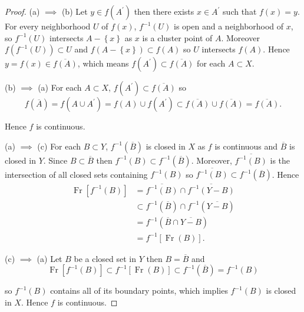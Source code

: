 \begin{proof}
	(a) \( \implies \) (b) Let \( y \in f(A^{\prime}) \) then there exists \( x \in A^{\prime} \) such that \( f(x) = y \). For every neighborhood \( U \) of \( f(x) \), \( f^{-1}(U) \) is open and a neighborhood of \( x \), so \( f^{-1}(U) \) intersects \( A - \left\{ x \right\} \) as \( x \) is a cluster point of \( A \). Moreover \( f(f^{-1}(U)) \subset U \) and \( f(A - \left\{x\right\}) \subset f(A) \) so \( U \) intersects \( f(A) \). Hence \( y = f(x) \in \overline{f(A)} \), which means \( f(A^{\prime}) \subset \overline{f(A)} \) for each \( A \subset X \).

	(b) \( \implies \) (a) For each \( A \subset X \), \( f(A^{\prime}) \subset \overline{f(A)} \) so
	\[
		f(\overline{A}) = f(A \cup A^{\prime}) = f(A) \cup f(A^{\prime}) \subset \overline{f(A)} \cup \overline{f(A)} = \overline{f(A)}.
	\]

	Hence \( f \) is continuous.

	(a) \( \implies \) (c) For each \( B \subset Y \), \( f^{-1}(\overline{B}) \) is closed in \( X \) as \( f \) is continuous and \( \overline{B} \) is closed in \( Y \). Since \( B \subset \overline{B} \) then \( f^{-1}(B) \subset f^{-1}(\overline{B}) \). Moreover, \( \overline{f^{-1}(B)} \) is the intersection of all closed sets containing \( f^{-1}(B) \) so \( \overline{f^{-1}(B)} \subset f^{-1}(\overline{B}) \). Hence
	\begingroup
	\allowdisplaybreaks%
	\begin{align*}
		\operatorname{Fr}\left\lbrack f^{-1}(B) \right\rbrack & = \overline{f^{-1}(B)} \cap \overline{f^{-1}(Y - B)}       \\
		                                                      & \subset f^{-1}(\overline{B}) \cap f^{-1}(\overline{Y - B}) \\
		                                                      & = f^{-1}(\overline{B} \cap \overline{Y - B})               \\
		                                                      & = f^{-1}\left\lbrack \operatorname{Fr}(B) \right\rbrack.
	\end{align*}
	\endgroup

	(c) \( \implies \) (a) Let \( B \) be a closed set in \( Y \) then \( B = \overline{B} \) and
	\[
		\operatorname{Fr}\left\lbrack f^{-1}(B) \right\rbrack \subset f^{-1}\left\lbrack \operatorname{Fr}(B) \right\rbrack \subset f^{-1}(\overline{B}) = f^{-1}(B)
	\]

	so \( f^{-1}(B) \) contains all of its boundary points, which implies \( f^{-1}(B) \) is closed in \(X\). Hence \( f \) is continuous.
\end{proof}

